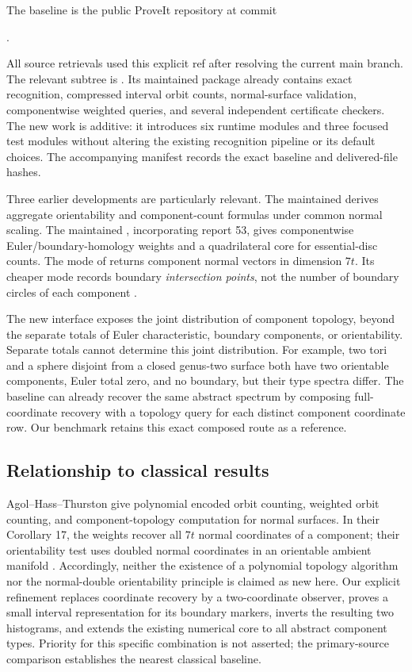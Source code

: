 The baseline is the public ProveIt repository at commit
\begin{center}\small\baseline.\end{center}
All source retrievals used this explicit ref after resolving the current main
branch. The relevant subtree is
. Its maintained 
package already contains exact recognition, compressed interval orbit counts,
normal-surface validation, componentwise weighted queries, and several
independent certificate checkers. The new work is additive: it introduces six
runtime modules and three focused test modules without altering the existing
recognition pipeline or its default choices. The accompanying manifest records
the exact baseline and delivered-file hashes.

Three earlier developments are particularly relevant. The maintained
 derives aggregate orientability and
component-count formulas under common normal scaling. The maintained
, incorporating report 53, gives
componentwise Euler/boundary-homology weights and a quadrilateral core for
essential-disc counts. The  mode of
 returns component normal vectors in dimension
$7t$. Its cheaper  mode records boundary \emph{intersection
points}, not the number of boundary circles of each component
\cite{proveit-baseline}.

The new interface exposes the joint distribution of component topology, beyond
the separate totals of Euler characteristic, boundary components, or
orientability. Separate totals cannot determine this joint distribution.
For example, two tori and a sphere disjoint from a closed genus-two surface
both have two orientable components, Euler total zero, and no boundary, but
their type spectra differ. The baseline can already recover the same abstract
spectrum by composing full-coordinate recovery with a topology query for each
distinct component coordinate row. Our benchmark retains this exact composed
route as a reference.

\subsection{Relationship to classical results}

Agol--Hass--Thurston give polynomial encoded orbit counting, weighted orbit
counting, and component-topology computation for normal surfaces. In their
Corollary 17, the weights recover all $7t$ normal coordinates of a component;
their orientability test uses doubled normal coordinates in an orientable
ambient manifold \cite{aht}. Accordingly, neither the existence of a polynomial
topology algorithm nor the normal-double orientability principle is claimed
as new here. Our explicit refinement replaces coordinate recovery by a
two-coordinate observer, proves a small interval representation for its
boundary markers, inverts the resulting two histograms, and extends the
existing numerical core to all abstract component types. Priority for this
specific combination is not asserted; the primary-source comparison establishes
the nearest classical baseline.

